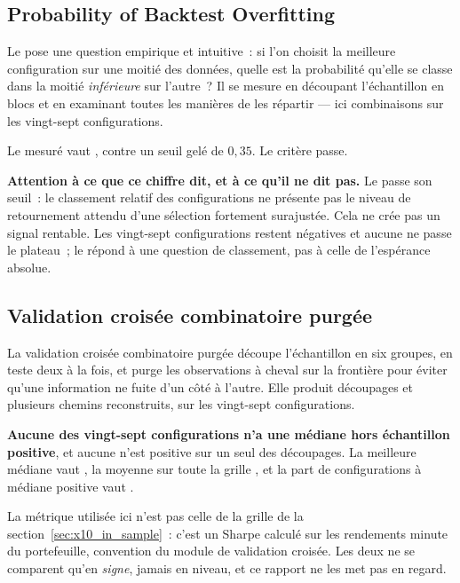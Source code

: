 \subsection{Probability of Backtest Overfitting}

Le  pose une question empirique et intuitive~: si l'on choisit la
meilleure configuration sur une moitié des données, quelle est la probabilité
qu'elle se classe dans la moitié \emph{inférieure} sur l'autre~? Il se mesure
en découpant l'échantillon en blocs et en examinant toutes les manières de
les répartir --- ici \XTenPBOSplits{} combinaisons sur les vingt-sept
configurations.

Le  mesuré vaut \metric{\XTenPBO}, contre un seuil gelé de
$0{,}35$. Le critère passe.

\begin{warningbox}
\textbf{Attention à ce que ce chiffre dit, et à ce qu'il ne dit pas.} Le
 passe son seuil~: le classement relatif des configurations ne
présente pas le niveau de retournement attendu d'une sélection fortement
surajustée. Cela ne crée pas un signal rentable. Les vingt-sept configurations
restent négatives et aucune ne passe le plateau~; le  répond à une
question de classement, pas à celle de l'espérance absolue.
\end{warningbox}

\subsection{Validation croisée combinatoire purgée}

La validation croisée combinatoire purgée découpe l'échantillon en six
groupes, en teste deux à la fois, et purge les observations à cheval sur la
frontière pour éviter qu'une information ne fuite d'un côté à l'autre. Elle
produit \XTenCPCVSplits{} découpages et plusieurs chemins reconstruits, sur
les vingt-sept configurations.



\textbf{Aucune des vingt-sept configurations n'a une médiane hors échantillon
positive}, et aucune n'est positive sur un seul des découpages. La meilleure
médiane vaut \XTenCPCVBestMedian, la moyenne sur toute la grille
\XTenCPCVMean, et la part de configurations à médiane positive vaut
\XTenCPCVPositiveShare.

La métrique utilisée ici n'est pas celle de la grille de la
section~\ref{sec:x10_in_sample}~: c'est un Sharpe calculé sur les rendements
minute du portefeuille, convention du module de validation croisée. Les deux
ne se comparent qu'en \emph{signe}, jamais en niveau, et ce rapport ne les met
pas en regard.

